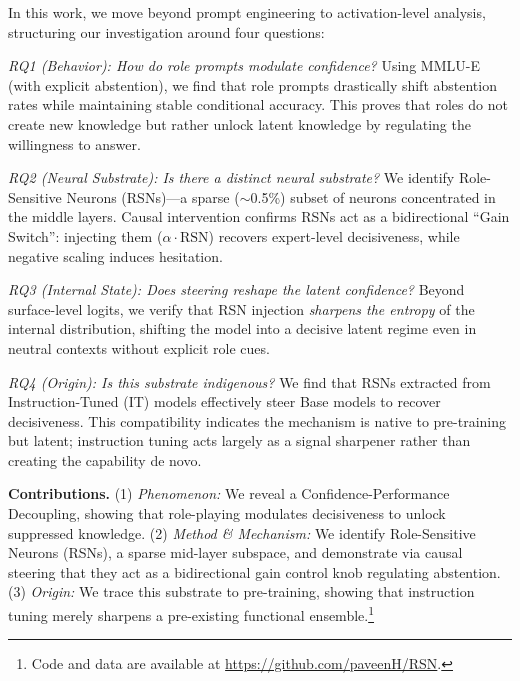 \documentclass{article}
\begin{document}
In this work, we move beyond prompt engineering to activation-level analysis, structuring our investigation around four questions:

\emph{RQ1 (Behavior): How do role prompts modulate confidence?} Using MMLU-E (with explicit abstention), we find that role prompts drastically shift abstention rates while maintaining stable conditional accuracy. This proves that roles do not create new knowledge but rather unlock latent knowledge by regulating the willingness to answer.

\emph{RQ2 (Neural Substrate): Is there a distinct neural substrate?} We identify Role-Sensitive Neurons (RSNs)—a sparse ($\sim$0.5\%) subset of neurons concentrated in the middle layers. Causal intervention confirms RSNs act as a bidirectional ``Gain Switch'': injecting them ($\alpha \cdot \text{RSN}$) recovers expert-level decisiveness, while negative scaling induces hesitation.

\emph{RQ3 (Internal State): Does steering reshape the latent confidence?} Beyond surface-level logits, we verify that RSN injection \emph{sharpens the entropy} of the internal distribution, shifting the model into a decisive latent regime even in neutral contexts without explicit role cues.


\emph{RQ4 (Origin): Is this substrate indigenous?} We find that RSNs extracted from Instruction-Tuned (IT) models effectively steer Base models to recover decisiveness. This compatibility indicates the mechanism is native to pre-training but latent; instruction tuning acts largely as a signal sharpener rather than creating the capability de novo.

\noindent\textbf{Contributions.} (1) \emph{Phenomenon:} We reveal a Confidence-Performance Decoupling, showing that role-playing modulates decisiveness to unlock suppressed knowledge. (2) \emph{Method \& Mechanism:} We identify Role-Sensitive Neurons (RSNs), a sparse mid-layer subspace, and demonstrate via causal steering that they act as a bidirectional gain control knob regulating abstention. (3) \emph{Origin:} We trace this substrate to pre-training, showing that instruction tuning merely sharpens a pre-existing functional ensemble.\footnote{Code and data are available at \url{https://github.com/paveenH/RSN}.}
\end{document}
